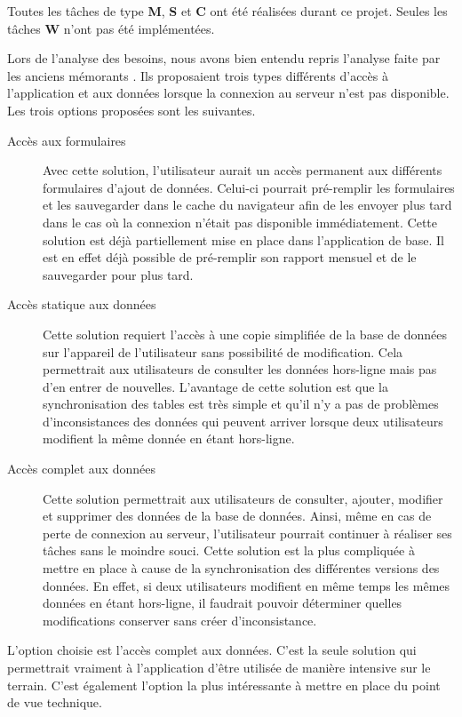 \documentclass{EPL-master-thesis-covers-FR}
\begin{document}
			
			Toutes les tâches de type \textbf{M}, \textbf{S} et \textbf{C} ont été réalisées durant ce projet. Seules les tâches \textbf{W} n'ont pas été implémentées.
			
			Lors de l'analyse des besoins, nous avons bien entendu repris l'analyse faite par les anciens mémorants \cite{ref:haitiwater}. Ils proposaient trois types différents d'accès à l'application et aux données lorsque la connexion au serveur n'est pas disponible. Les trois options proposées sont les suivantes. 
			
			\begin{description}
				\item[Accès aux formulaires] Avec cette solution, l'utilisateur aurait un accès permanent aux différents formulaires d'ajout de données. Celui-ci pourrait pré-remplir les formulaires et les sauvegarder dans le cache du navigateur afin de les envoyer plus tard dans le cas où la connexion n'était pas disponible immédiatement. Cette solution est déjà partiellement mise en place dans l'application de base. Il est en effet déjà possible de pré-remplir son rapport mensuel et de le sauvegarder pour plus tard.
				\item[Accès statique aux données] Cette solution requiert l'accès à une copie simplifiée de la base de données sur l'appareil de l'utilisateur sans possibilité de modification. Cela permettrait aux utilisateurs de consulter les données hors-ligne mais pas d'en entrer de nouvelles. L'avantage de cette solution est que la synchronisation des tables est très simple et qu'il n'y a pas de problèmes d'inconsistances des données qui peuvent arriver lorsque deux utilisateurs modifient la même donnée en étant hors-ligne.
				\item[Accès complet aux données] Cette solution permettrait aux utilisateurs de consulter, ajouter, modifier et supprimer des données de la base de données. Ainsi, même en cas de perte de connexion au serveur, l'utilisateur pourrait continuer à réaliser ses tâches sans le moindre souci. Cette solution est la plus compliquée à mettre en place à cause de la synchronisation des différentes versions des données. En effet, si deux utilisateurs modifient en même temps les mêmes données en étant hors-ligne, il faudrait pouvoir déterminer quelles modifications conserver sans créer d'inconsistance.  
			\end{description}
			
			L'option choisie est l'accès complet aux données. C'est la seule solution qui permettrait vraiment à l'application d'être utilisée de manière intensive sur le terrain. C'est également l'option la plus intéressante à mettre en place du point de vue technique.
			
\end{document}
